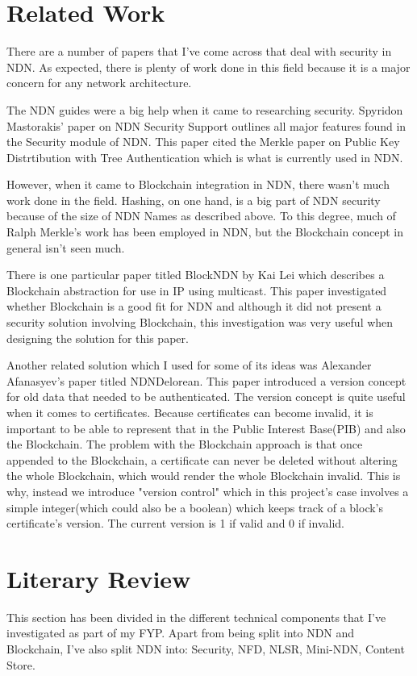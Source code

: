 \section{Related Work}
There are a number of papers that I've come across that deal with security in NDN. As expected, there is plenty of work done in this field because it is a major concern for any network architecture.\par 

The NDN guides were a big help when it came to researching security. Spyridon Mastorakis' paper on NDN Security Support outlines all major features found in the Security module of NDN. This paper cited the Merkle paper on Public Key Distrtibution with Tree Authentication which is what is currently used in NDN.\par



However, when it came to Blockchain integration in NDN, there wasn't much work done in the field. Hashing, on one hand, is a big part of NDN security because of the size of NDN Names as described above. To this degree, much of Ralph Merkle's work has been employed in NDN, but the Blockchain concept in general isn't seen much. 

There is one particular paper titled BlockNDN by Kai Lei which describes a Blockchain abstraction for use in IP using multicast. This paper investigated whether Blockchain is a good fit for NDN and although it did not present a security solution involving Blockchain, this investigation was very useful when designing the solution for this paper.\par

Another related solution which I used for some of its ideas was Alexander Afanasyev's paper titled NDNDelorean. This paper introduced a version concept for old data that needed to be authenticated. The version concept is quite useful when it comes to certificates. Because certificates can become invalid, it is important to be able to represent that in the Public Interest Base(PIB) and also the Blockchain. The problem with the Blockchain approach is that once appended to the Blockchain, a certificate can never be deleted without altering the whole Blockchain, which would render the whole Blockchain invalid. This is why, instead we introduce "version control" which in this project's case involves a simple integer(which could also be a boolean) which keeps track of a block's certificate's version. The current version is 1 if valid and 0 if invalid.
\section{Literary Review}
This section has been divided in the different technical components that I've investigated as part of my FYP. Apart from being split into NDN and Blockchain, I've also split NDN into: Security, NFD, NLSR, Mini-NDN, Content Store.

